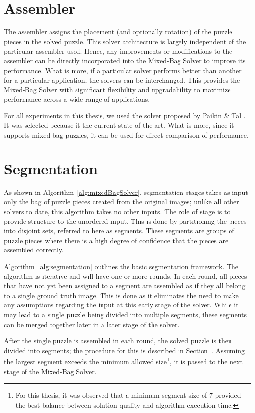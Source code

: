 \section{Assembler}\label{sec:SolverAssembler}

The assembler assigns the placement (and optionally rotation) of the puzzle pieces in the solved puzzle.  This solver architecture is largely independent of the particular assembler used.  Hence, any improvements or modifications to the assembler can be directly incorporated into the Mixed-Bag Solver to improve its performance.  What is more, if a particular solver performs better than another for a particular application, the solvers can be interchanged.  This provides the Mixed-Bag Solver with significant flexibility and upgradability to maximize performance across a wide range of applications.

For all experiments in this thesis, we used the solver proposed by Paikin \& Tal \cite{paikin2015}.  It was selected because it the current state-of-the-art.  What is more, since it supports mixed bag puzzles, it can be used for direct comparison of performance.

\section{Segmentation}\label{sec:Segmentation}

As shown in Algorithm~\ref{alg:mixedBagSolver}, segmentation stages takes as input only the bag of puzzle pieces created from the original images; unlike all other solvers to date, this algorithm takes no other inputs.  The role of stage is to provide structure to the unordered input.  This is done by partitioning the pieces into disjoint sets, referred to here as segments.  These segments are groups of puzzle pieces where there is a high degree of confidence that the pieces are assembled correctly.

Algorithm~\ref{alg:segmentation} outlines the basic segmentation framework.  The algorithm is iterative and will have one or more rounds.  In each round, all pieces that have not yet been assigned to a segment are assembled as if they all belong to a single ground truth image.  This is done as it eliminates the need to make any assumptions regarding the input at this early stage of the solver.  While it may lead to a single puzzle being divided into multiple segments, these segments can be merged together later in a later stage of the solver.

After the single puzzle is assembled in each round, the solved puzzle is then divided into segments; the procedure for this is described in Section~\label{sec:segmentPuzzle}.  Assuming the largest segment exceeds the minimum allowed size\footnote{For this thesis, it was observed that a minimum segment size of 7 provided the best balance between solution quality and algorithm execution time.}, it is passed to the next stage of the Mixed-Bag Solver.  

